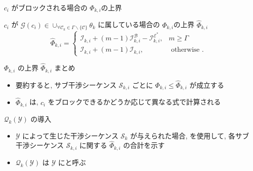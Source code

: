 \begin{frame}{$c_{i}$ がブロックされる場合の $\Phi_{k, i}$の上界}
    \begin{definition}
        $c_{i}$ が $\mathcal{G}\left(c_{i}\right) \in \cup_{\forall \mathcal{C}_{k} \in \Gamma \backslash\{\mathcal{C}\}} \theta_{k}$ に属している場合の $\Phi_{k, i}$の上界 $\hat{\Phi}_{k, i}$
        \begin{equation*}
            \hat{\Phi}_{k, i}=\left\{\begin{array}{lr}
                \mathcal{I}_{k, i}+(m-1) \mathcal{I}_{k, i}^{\mathcal{B}}-\mathcal{I}_{k, i}^{\mathcal{E}^{*}}, & m \geq \Gamma         \\
                \mathcal{I}_{k, i}+(m-1) \mathcal{I}_{k, i},                                                    & \text { otherwise } .
            \end{array}\right.
        \end{equation*}
    \end{definition}
\end{frame}

\begin{frame}{$\Phi_{k, i}$ の上界 $\hat{\Phi}_{k, i}$ まとめ}
    \begin{itemize}
        \item 要約すると, サブ干渉シーケンス $\mathcal{S}_{k, i}$ ごとに $\Phi_{k, i} \leq \hat{\Phi}_{k, i}$ が成立する
        \item $\hat{\Phi}_{k, i}$ は, $c_{i}$ をブロックできるかどうか応じて異なる式で計算される
    \end{itemize}
\end{frame}

\begin{frame}{$\mathcal{Q}_{k}(\mathcal{Y})$ の導入}
    \begin{itemize}
        \item $\mathcal{Y}$ によって生じた干渉シーケンス $\mathcal{S}_{k}$ が与えられた場合,  を使用して, 各サブ干渉シーケンス $\mathcal{S}_{k, i}$ に関する $\hat{\Phi}_{k, i}$ の合計を示す
        \item $\mathcal{Q}_{k}(\mathcal{Y})$ は $\mathcal{Y}$ にと呼ぶ
    \end{itemize}
\end{frame}

